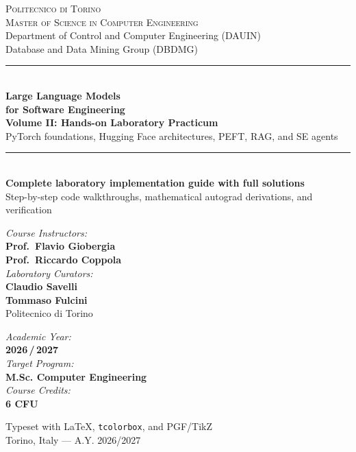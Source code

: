 \documentclass[../labs.tex]{subfiles}
\begin{document}
\begin{titlepage}
\begin{center}

\vspace*{1.2cm}

{\Large\scshape Politecnico di Torino}\\[0.3cm]
{\large\scshape Master of Science in Computer Engineering}\\[0.2cm]
{\small Department of Control and Computer Engineering (DAUIN)}\\[0.1cm]
{\small Database and Data Mining Group (DBDMG)}\\[1.3cm]

\rule{\linewidth}{1.5pt}\\[0.5cm]
{\Huge\bfseries\color{politoNavy} Large Language Models\\[0.3cm] for Software Engineering}\\[0.4cm]
{\Large\bfseries\color{steelBlue} Volume II: Hands-on Laboratory Practicum}\\[0.2cm]
{\large\color{bodyGray} PyTorch foundations, Hugging Face architectures, PEFT, RAG, and SE agents}\\[0.3cm]
\rule{\linewidth}{1.5pt}\\[1.2cm]

{\large\bfseries Complete laboratory implementation guide with full solutions}\\[0.4cm]
{\normalsize Step-by-step code walkthroughs, mathematical autograd derivations, and verification}\\[2.0cm]

\begin{minipage}[t]{0.48\textwidth}
\begin{flushleft} \large
\emph{Course Instructors:}\\
\textbf{Prof.~Flavio Giobergia}\\
\textbf{Prof.~Riccardo Coppola}\\[0.3cm]
\emph{Laboratory Curators:}\\
\textbf{Claudio Savelli}\\
\textbf{Tommaso Fulcini}\\
\vspace{0.2cm}
{\small Politecnico di Torino}
\end{flushleft}
\end{minipage}
\hfill
\begin{minipage}[t]{0.45\textwidth}
\begin{flushright} \large
\emph{Academic Year:}\\
\textbf{2026\,/\,2027}\\[0.4cm]
\emph{Target Program:}\\
\textbf{M.Sc. Computer Engineering}\\[0.4cm]
\emph{Course Credits:}\\
\textbf{6 CFU}
\end{flushright}
\end{minipage}

\vfill

{\small\sffamily\color{bodyGray} Typeset with \LaTeX{}, \texttt{tcolorbox}, and PGF/TikZ\\
Torino, Italy --- A.Y. 2026/2027}

\end{center}
\end{titlepage}
\end{document}
